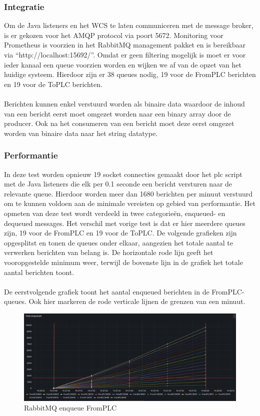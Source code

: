 \subsubsection{Integratie}
Om de Java listeners en het WCS te laten communiceren met de message broker, is er gekozen voor het AMQP protocol via poort 5672.
Monitoring voor Prometheus is voorzien in het RabbitMQ management pakket en is bereikbaar via ``http://localhost:15692/''.
Omdat er geen filtering mogelijk is moet er voor ieder kanaal een queue voorzien worden en wijken we af van de opzet van het huidige systeem.
Hierdoor zijn er 38 queues nodig, 19 voor de FromPLC berichten en 19 voor de ToPLC berichten.
\\\\
Berichten kunnen enkel verstuurd worden als binaire data waardoor de inhoud van een bericht eerst moet omgezet worden naar een binary array door de producer.
Ook na het consumeren van een bericht moet deze eerst omgezet worden van binaire data naar het string datatype.

\subsubsection{Performantie}
In deze test worden opnieuw 19 socket connecties gemaakt door het plc script met de Java listeners die elk per 0.1 seconde een bericht versturen naar de relevante queue.
Hierdoor worden meer dan 1680 berichten per minuut verstuurd om te kunnen voldoen aan de minimale vereisten op gebied van performantie.
Het opmeten van deze test wordt verdeeld in twee categorieën, enqueued- en dequeued messages.
Het verschil met vorige test is dat er hier meerdere queues zijn, 19 voor de FromPLC en 19 voor de ToPLC. 
\newpage
De volgende grafieken zijn opgesplitst en tonen de queues onder elkaar, aangezien het totale aantal te verwerken berichten van belang is.
De horizontale rode lijn geeft het vooropgestelde minimum weer, terwijl de bovenste lijn in de grafiek het totale aantal berichten toont.
\\\\
De eerstvolgende grafiek toont het aantal enqueued berichten in de FromPLC-queues.
Ook hier markeren de rode verticale lijnen de grenzen van een minuut. 

\begin{figure}[h!]
  \centering
  \includegraphics[width=.95\textwidth]{img/rabbitmq-enqueue-count-FromPLC.png}
  \caption{\label{fig:rabbitmq_enqueue_fromplc_count}RabbitMQ enqueue FromPLC}
\end{figure}

